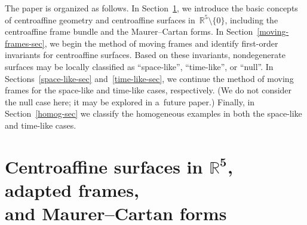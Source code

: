 \documentclass[10pt,a4paper]{amsart}
\numberwithin{equation}{section}
\theoremstyle{definition}
\begin{document}
The paper is organized as follows.
In Section~\ref{background-sec}, we introduce the basic concepts of centroaf\/f\/ine geometry and centroaf\/f\/ine surfaces
in~$\mathbb{R}^5 \setminus \{0 \}$, including the centroaf\/f\/ine frame bundle and the Maurer--Cartan forms.
In Section~\ref{moving-frames-sec}, we begin the method of moving frames and identify f\/irst-order invariants for
centroaf\/f\/ine surfaces.
Based on these invariants, nondegenerate surfaces may be locally classif\/ied as ``space-like'', ``time-like'', or ``null''.
In Sections~\ref{space-like-sec} and~\ref{time-like-sec}, we continue the method of moving frames for the space-like and
time-like cases, respectively.
(We do not consider the null case here; it may be explored in a~future paper.) Finally, in Section~\ref{homog-sec} we
classify the homogeneous examples in both the space-like and time-like cases.

\section[Centroaf\/f\/ine surfaces in $\mathbb{R}^5$, adapted frames, and Maurer--Cartan forms]{Centroaf\/f\/ine surfaces
in $\boldsymbol{\mathbb{R}^5}$, adapted frames,\\ and Maurer--Cartan forms}
\label{background-sec}
\end{document}
